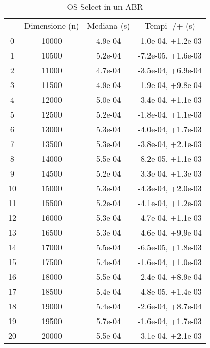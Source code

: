\begin{table}
\centering
\caption{OS-Select in un ABR}
\label{OS-Select in un ABR}
\begin{adjustbox}{width=1\textwidth/2}
\begin{tabular}{|c|c|c|c|}
\hline
 & Dimensione (n) & Mediana (s) & Tempi -/+ (s) \\
0 & 10000 & 4.9e-04 & -1.0e-04, +1.2e-03 \\
\cline{1-4}
1 & 10500 & 5.2e-04 & -7.2e-05, +1.6e-03 \\
\cline{1-4}
2 & 11000 & 4.7e-04 & -3.5e-04, +6.9e-04 \\
\cline{1-4}
3 & 11500 & 4.9e-04 & -1.9e-04, +9.8e-04 \\
\cline{1-4}
4 & 12000 & 5.0e-04 & -3.4e-04, +1.1e-03 \\
\cline{1-4}
5 & 12500 & 5.2e-04 & -1.8e-04, +1.1e-03 \\
\cline{1-4}
6 & 13000 & 5.3e-04 & -4.0e-04, +1.7e-03 \\
\cline{1-4}
7 & 13500 & 5.3e-04 & -3.8e-04, +2.1e-03 \\
\cline{1-4}
8 & 14000 & 5.5e-04 & -8.2e-05, +1.1e-03 \\
\cline{1-4}
9 & 14500 & 5.2e-04 & -3.3e-04, +1.3e-03 \\
\cline{1-4}
10 & 15000 & 5.3e-04 & -4.3e-04, +2.0e-03 \\
\cline{1-4}
11 & 15500 & 5.2e-04 & -4.1e-04, +1.2e-03 \\
\cline{1-4}
12 & 16000 & 5.3e-04 & -4.7e-04, +1.1e-03 \\
\cline{1-4}
13 & 16500 & 5.3e-04 & -4.6e-04, +9.9e-04 \\
\cline{1-4}
14 & 17000 & 5.5e-04 & -6.5e-05, +1.8e-03 \\
\cline{1-4}
15 & 17500 & 5.4e-04 & -1.6e-04, +1.0e-03 \\
\cline{1-4}
16 & 18000 & 5.5e-04 & -2.4e-04, +8.9e-04 \\
\cline{1-4}
17 & 18500 & 5.4e-04 & -4.8e-05, +1.4e-03 \\
\cline{1-4}
18 & 19000 & 5.4e-04 & -2.6e-04, +8.7e-04 \\
\cline{1-4}
19 & 19500 & 5.7e-04 & -1.6e-04, +1.7e-03 \\
\cline{1-4}
20 & 20000 & 5.5e-04 & -3.1e-04, +2.1e-03 \\
\cline{1-4}
\end{tabular}
\end{adjustbox}
\end{table}

